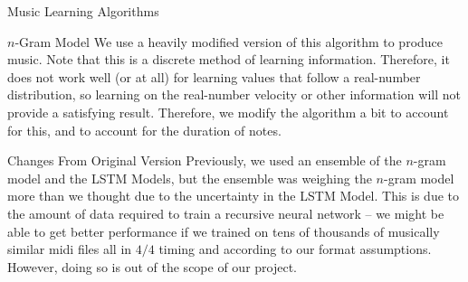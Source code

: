 \documentclass[11pt]{article}
\begin{document}
\begin{section}{Music Learning Algorithms}
\begin{subsection}{$n$-Gram Model}
We use a heavily modified version of this algorithm to produce music. Note that this is a discrete method of learning information. Therefore, it does not work well (or at all) for learning values that follow a real-number distribution, so learning on the real-number velocity or other information will not provide a satisfying result. Therefore, we modify the algorithm a bit to account for this, and to account for the duration of notes.
\end{subsection}

\begin{subsection}{Changes From Original Version}
Previously, we used an ensemble of the $n$-gram model and the LSTM Models, but the ensemble was weighing the $n$-gram model more than we thought due to the uncertainty in the LSTM Model. This is due to the amount of data required to train a recursive neural network -- we might be able to get better performance if we trained on tens of thousands of musically similar midi files all in $4/4$ timing and according to our format assumptions. However, doing so is out of the scope of our project. 
\end{subsection}
\end{section}
\end{document}
